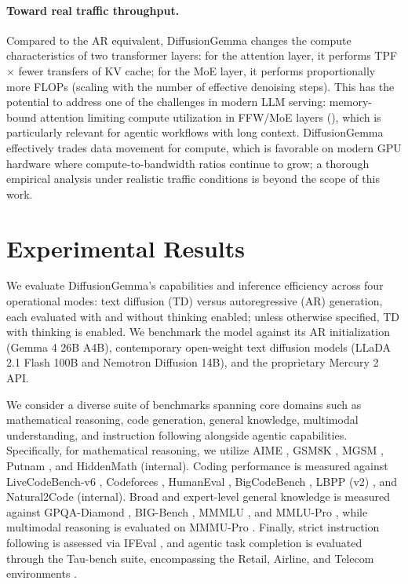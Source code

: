\documentclass[11pt, a4paper, logo, copyright, gdm]{google}
\begin{document}
\paragraph{Toward real traffic throughput.} Compared to the AR equivalent, DiffusionGemma changes the compute characteristics of two transformer layers: for the attention layer, it performs TPF$\times$ fewer transfers of KV cache; for the MoE layer, it performs proportionally more FLOPs (scaling with the number of effective denoising steps). This has the potential to address one of the challenges in modern LLM serving: memory-bound attention limiting compute utilization in FFW/MoE layers (\citealp{zhu2024nanoflow, tang2024quest, zhu2025megascaleinfer}), which is particularly relevant for agentic workflows with long context. DiffusionGemma effectively trades data movement for compute, which is favorable on modern GPU hardware where compute-to-bandwidth ratios continue to grow; a thorough empirical analysis under realistic traffic conditions is beyond the scope of this work.

\section{Experimental Results} \label{sec:experiments}

We evaluate DiffusionGemma's capabilities and inference efficiency across four operational modes: text diffusion (TD) versus autoregressive (AR) generation, each evaluated with and without thinking enabled; unless otherwise specified, TD with thinking is enabled. We benchmark the model against its AR initialization (Gemma 4 26B A4B), contemporary open-weight text diffusion models (LLaDA 2.1 Flash 100B and Nemotron Diffusion 14B), and the proprietary Mercury 2 API.

We consider a diverse suite of benchmarks spanning core domains such as mathematical reasoning, code generation, general knowledge, multimodal understanding, and instruction following alongside agentic capabilities. Specifically, for mathematical reasoning, we utilize AIME \citep{dekoninck2026matharena}, GSM8K \citep{cobbe2021training}, MGSM \citep{shi2022language}, Putnam \citep{tsoukalas2024putnambench}, and HiddenMath (internal). Coding performance is measured against LiveCodeBench-v6 \citep{jain2025livecodebench}, Codeforces \citep{quan2025codeelo}, HumanEval \citep{chen2021evaluating},  BigCodeBench \citep{zhuo2025bigcodebench}, LBPP (v2) \citep{matton2024leakage}, and Natural2Code (internal). Broad and expert-level general knowledge is measured against GPQA-Diamond \citep{rein2023gpqa}, BIG-Bench \citep{suzgun2022challenging}, MMMLU \citep{openai2024mmmlu}, and MMLU-Pro \citep{wang2024mmlupro}, while multimodal reasoning is evaluated on MMMU-Pro \citep{yue2025mmmu}. Finally, strict instruction following is assessed via IFEval \citep{zhou2023instruction}, and agentic task completion is evaluated through the Tau-bench suite, encompassing the Retail, Airline, and Telecom environments \citep{yao2024tau}.
\end{document}
